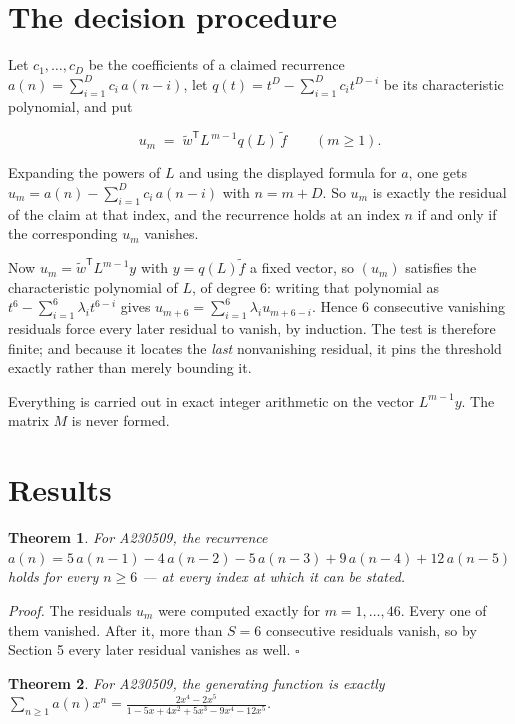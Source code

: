 \documentclass[11pt]{article}
\newtheorem{theorem}{Theorem}
\theoremstyle{definition}
\begin{document}
\section{The decision procedure}

Let $c_1,\dots,c_D$ be the coefficients of a claimed recurrence $a(n) = \sum_{i=1}^{D} c_i\,a(n-i)$, let $q(t) = t^{D} - \sum_{i=1}^{D} c_i t^{D-i}$ be its characteristic polynomial, and put

\[u_m \;=\; \tilde w^{\mathsf T} L^{\,m-1} q(L)\,\tilde f \qquad (m \ge 1).\]

Expanding the powers of $L$ and using the displayed formula for $a$, one gets $u_m = a(n) - \sum_{i=1}^{D} c_i\,a(n-i)$ with $n = m + D$. So $u_m$ is exactly the residual of the claim at that index, and the recurrence holds at an index $n$ if and only if the corresponding $u_m$ vanishes.

Now $u_m = \tilde w^{\mathsf T} L^{m-1} y$ with $y = q(L)\tilde f$ a fixed vector, so $(u_m)$ satisfies the characteristic polynomial of $L$, of degree $6$: writing that polynomial as $t^{6} - \sum_{i=1}^{6} \lambda_i t^{6-i}$ gives $u_{m+6} = \sum_{i=1}^{6} \lambda_i u_{m+6-i}$. Hence $6$ consecutive vanishing residuals force every later residual to vanish, by induction. The test is therefore finite; and because it locates the {\itshape last} nonvanishing residual, it pins the threshold exactly rather than merely bounding it.

Everything is carried out in exact integer arithmetic on the vector $L^{m-1}y$. The matrix $M$ is never formed.

\section{Results}

\begin{theorem} For A230509, the recurrence $a(n) = 5\,a(n-1) - 4\,a(n-2) - 5\,a(n-3) + 9\,a(n-4) + 12\,a(n-5)$ holds for every $n \ge 6$ --- at every index at which it can be stated.\end{theorem}

{\itshape Proof.} The residuals $u_m$ were computed exactly for $m = 1,\dots,46$. Every one of them vanished. After it, more than $S = 6$ consecutive residuals vanish, so by Section 5 every later residual vanishes as well. $\square$

\begin{theorem} For A230509, the generating function is exactly $\sum_{n\ge 1} a(n)x^n = \frac{2x^{4} - 2x^{5}}{1 - 5x + 4x^{2} + 5x^{3} - 9x^{4} - 12x^{5}}$.\end{theorem}
\end{document}
